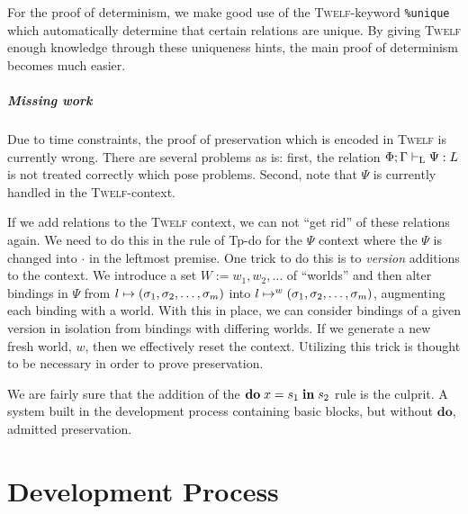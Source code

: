 \documentclass[a4paper, oneside, 10pt, draft]{memoir}
\newcommand{\twelf}{\textsc{Twelf}}
\begin{document}
For the proof of determinism, we make good use of the \twelf{}-keyword
\texttt{\%{}unique} which automatically determine that certain
relations are unique. By giving \twelf{} enough knowledge through
these uniqueness hints, the main proof of determinism becomes much
easier.

\paragraph{Missing work}
Due to time constraints, the proof of preservation which is encoded in
\twelf{} is currently wrong. There are several problems as is: first,
the relation $\Phi;\Gamma |-_{\mathrm{L}} \Psi : L$ is not treated correctly
which pose problems. Second, note that $\Psi$ is currently handled in
the \twelf{}-context.

If we add relations to the \twelf{} context, we can not ``get rid'' of
these relations again. We need to do this in the rule of Tp-do for the
$\Psi$ context where the $\Psi$ is changed into $\cdot$ in the
leftmost premise. One trick to do this is to \emph{version} additions
to the context. We introduce a set $W := w_1, w_2, \dotsc$ of
``worlds'' and then alter bindings in $\Psi$ from $l \mapsto
(\sigma_1, \sigma_2, \dotsc, \sigma_m)$ into $l \mapsto^{w} (\sigma_1, \sigma_2, \dotsc, \sigma_m)$, augmenting each binding with
a world. With this in place, we can consider bindings of a
given version in isolation from bindings with differing worlds. If
we generate a new fresh world, $w$, then we effectively reset the
context. Utilizing this trick is thought to be necessary in order to
prove preservation.

We are fairly sure that the addition of the $\mathbf{do} \; x = s_1 \; \mathbf{in} \; s_2$ rule
is the culprit. A system built in the development process containing
basic blocks, but without $\mathbf{do}$, admitted preservation.

\chapter{Development Process}
\end{document}
